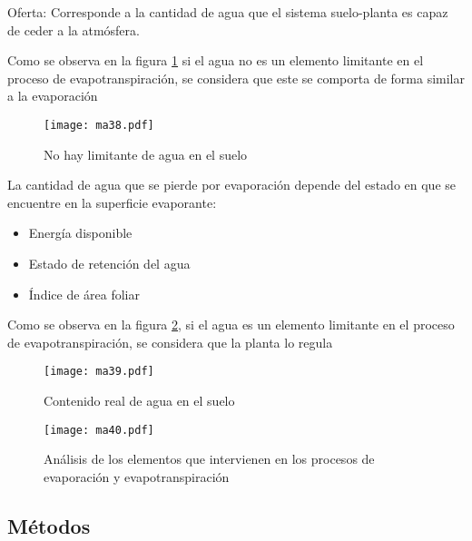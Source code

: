         Oferta: Corresponde a la cantidad de agua que el sistema suelo-planta es capaz de ceder a la atmósfera.
        
        Como se observa en la figura \ref{ma38} si el agua no es un elemento limitante en el proceso de evapotranspiración, se considera que este se comporta de forma similar a la evaporación
        \begin{figure}[h!]
        \centering
          \texttt{[image: ma38.pdf]}
          \caption{No hay limitante de agua en el suelo}
          \label{ma38}
        \end{figure}
        
        La cantidad de agua que se pierde por evaporación depende del estado en que se encuentre en la superficie evaporante:
        \begin{itemize}
            \item Energía disponible
            \item Estado de retención del agua
            \item Índice de área foliar    
        \end{itemize}
        Como se observa en la figura \ref{ma39}, si el agua es un elemento limitante en el proceso de evapotranspiración, se considera que la planta lo regula
        \begin{figure}[h!]
        \centering
          \texttt{[image: ma39.pdf]}
          \caption{Contenido real de agua en el suelo}
          \label{ma39}
        \end{figure}
        \begin{figure}[h!]
            \centering
              \texttt{[image: ma40.pdf]}
              \caption{Análisis de los elementos que intervienen en los procesos de evaporación y evapotranspiración}
              \label{ma40}
        \end{figure}
        
        \subsection{Métodos}
        
